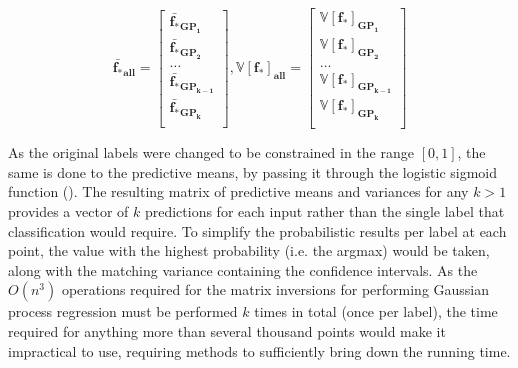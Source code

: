 \begin{equation}
    \mathbf{\bar{f_*}_{all}} = \begin{bmatrix}
        \mathbf{\bar{f_*}_{GP_1}} \\
        \mathbf{\bar{f_*}_{GP_2}} \\
        \ldots \\
        \mathbf{\bar{f_*}_{GP_{k-1}}} \\
        \mathbf{\bar{f_*}_{GP_k}} \\
    \end{bmatrix}, \mathbf{\mathbb{V}[f_*]_{all}} = \begin{bmatrix}
        \mathbf{\mathbb{V}[f_*]_{GP_1}} \\
        \mathbf{\mathbb{V}[f_*]_{GP_2}} \\
        \ldots \\
        \mathbf{\mathbb{V}[f_*]_{GP_{k-1}}} \\
        \mathbf{\mathbb{V}[f_*]_{GP_k}} \\
    \end{bmatrix}
\end{equation}

As the original labels were changed to be constrained in the range $[0, 1]$, the same is done to the predictive means, by passing it through the logistic sigmoid function (). The resulting matrix of predictive means and variances for any $k > 1$ provides a vector of $k$ predictions for each input rather than the single label that classification would require. To simplify the probabilistic results per label at each point, the value with the highest probability (i.e. the argmax) would be taken, along with the matching variance containing the confidence intervals. As the $O(n^3)$ operations required for the matrix inversions for performing Gaussian process regression must be performed $k$ times in total (once per label), the time required for anything more than several thousand points would make it impractical to use, requiring methods to sufficiently bring down the running time.

